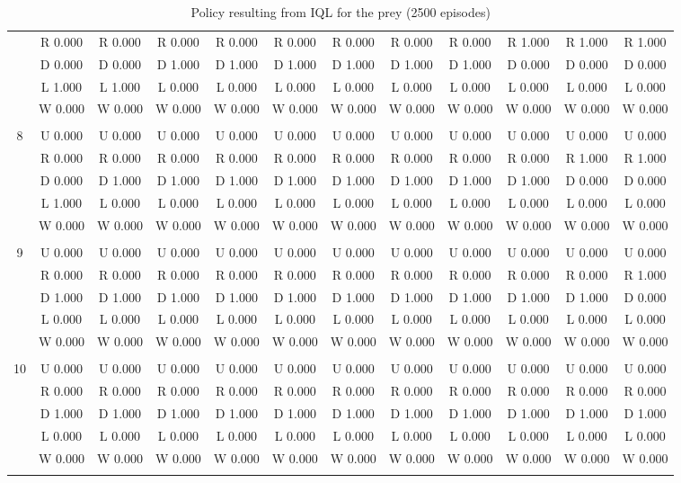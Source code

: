 \begin{table}[htbp]
\begin{tiny}
\begin{tabular}{c|c|c|c|c|c|c|c|c|c|c|c|}
&R 0.000&R 0.000&R 0.000&R 0.000&R 0.000&R 0.000&R 0.000&R 0.000&R 1.000&R 1.000&R 1.000\\
&D 0.000&D 0.000&D 1.000&D 1.000&D 1.000&D 1.000&D 1.000&D 1.000&D 0.000&D 0.000&D 0.000\\
&L 1.000&L 1.000&L 0.000&L 0.000&L 0.000&L 0.000&L 0.000&L 0.000&L 0.000&L 0.000&L 0.000\\
&W 0.000&W 0.000&W 0.000&W 0.000&W 0.000&W 0.000&W 0.000&W 0.000&W 0.000&W 0.000&W 0.000\\
\hline \\
8&U 0.000&U 0.000&U 0.000&U 0.000&U 0.000&U 0.000&U 0.000&U 0.000&U 0.000&U 0.000&U 0.000\\
&R 0.000&R 0.000&R 0.000&R 0.000&R 0.000&R 0.000&R 0.000&R 0.000&R 0.000&R 1.000&R 1.000\\
&D 0.000&D 1.000&D 1.000&D 1.000&D 1.000&D 1.000&D 1.000&D 1.000&D 1.000&D 0.000&D 0.000\\
&L 1.000&L 0.000&L 0.000&L 0.000&L 0.000&L 0.000&L 0.000&L 0.000&L 0.000&L 0.000&L 0.000\\
&W 0.000&W 0.000&W 0.000&W 0.000&W 0.000&W 0.000&W 0.000&W 0.000&W 0.000&W 0.000&W 0.000\\
\hline \\
9&U 0.000&U 0.000&U 0.000&U 0.000&U 0.000&U 0.000&U 0.000&U 0.000&U 0.000&U 0.000&U 0.000\\
&R 0.000&R 0.000&R 0.000&R 0.000&R 0.000&R 0.000&R 0.000&R 0.000&R 0.000&R 0.000&R 1.000\\
&D 1.000&D 1.000&D 1.000&D 1.000&D 1.000&D 1.000&D 1.000&D 1.000&D 1.000&D 1.000&D 0.000\\
&L 0.000&L 0.000&L 0.000&L 0.000&L 0.000&L 0.000&L 0.000&L 0.000&L 0.000&L 0.000&L 0.000\\
&W 0.000&W 0.000&W 0.000&W 0.000&W 0.000&W 0.000&W 0.000&W 0.000&W 0.000&W 0.000&W 0.000\\
\hline \\
10&U 0.000&U 0.000&U 0.000&U 0.000&U 0.000&U 0.000&U 0.000&U 0.000&U 0.000&U 0.000&U 0.000\\
&R 0.000&R 0.000&R 0.000&R 0.000&R 0.000&R 0.000&R 0.000&R 0.000&R 0.000&R 0.000&R 0.000\\
&D 1.000&D 1.000&D 1.000&D 1.000&D 1.000&D 1.000&D 1.000&D 1.000&D 1.000&D 1.000&D 1.000\\
&L 0.000&L 0.000&L 0.000&L 0.000&L 0.000&L 0.000&L 0.000&L 0.000&L 0.000&L 0.000&L 0.000\\
&W 0.000&W 0.000&W 0.000&W 0.000&W 0.000&W 0.000&W 0.000&W 0.000&W 0.000&W 0.000&W 0.000\\
\hline \\
\end{tabular}
\end{tiny}
\caption{Policy resulting from IQL for the prey (2500 episodes)}
\end{table}
